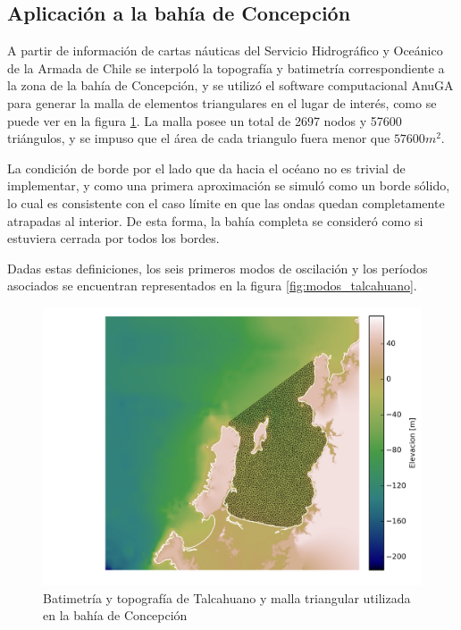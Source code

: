 \subsection{Aplicaci\'on a la bah\'ia de Concepci\'on}

A partir de informaci\'on  de cartas n\'auticas del Servicio Hidrogr\'afico y Oce\'anico de la Armada de Chile \cite{shoa} se interpol\'o la topograf\'ia y batimetr\'ia correspondiente a la zona de la bah\'ia de Concepci\'on, y se utiliz\'o el software computacional AnuGA \cite{anuga} para generar la malla de elementos triangulares en el lugar de inter\'es, como se puede ver en la figura \ref{fig:bati-talcahuano}. La malla posee un total de 2697 nodos y 57600 tri\'angulos, y se impuso que el \'area de cada triangulo fuera menor que $57600m^2$. 

La condici\'on de borde por el lado que da hacia el oc\'eano no es trivial de implementar, y como una primera aproximaci\'on se simul\'o como un borde s\'olido, lo cual es consistente con el caso l\'imite en que las ondas quedan completamente atrapadas al interior. De esta forma, la bah\'ia completa se consider\'o como si estuviera cerrada por todos los bordes. 

Dadas estas definiciones, los seis primeros modos de oscilaci\'on y los per\'iodos asociados se encuentran representados en la figura \ref{fig:modos_talcahuano}.

\begin{figure}
  \centering
  \includegraphics[width=15cm]{figuras/04bati+malla.png}
  \caption{ Batimetr\'ia y topograf\'ia de Talcahuano y malla triangular utilizada en la bah\'ia de Concepci\'on}  
  \label{fig:bati-talcahuano}
\end{figure}

